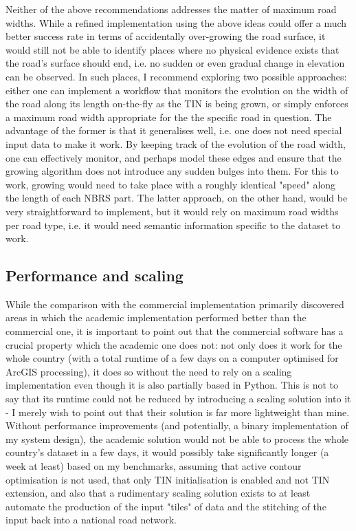 Neither of the above recommendations addresses the matter of maximum road widths. While a refined implementation using the above ideas could offer a much better success rate in terms of accidentally over-growing the road surface, it would still not be able to identify places where no physical evidence exists that the road's surface should end, i.e. no sudden or even gradual change in elevation can be observed. In such places, I recommend exploring two possible approaches: either one can implement a workflow that monitors the evolution on the width of the road along its length on-the-fly as the TIN is being grown, or simply enforces a maximum road width appropriate for the the specific road in question. The advantage of the former is that it generalises well, i.e. one does not need special input data to make it work. By keeping track of the evolution of the road width, one can effectively monitor, and perhaps model these edges and ensure that the growing algorithm does not introduce any sudden bulges into them. For this to work, growing would need to take place with a roughly identical "speed" along the length of each NBRS part. The latter approach, on the other hand, would be very straightforward to implement, but it would rely on maximum road widths per road type, i.e. it would need semantic information specific to the dataset to work.

\subsection{Performance and scaling}
\label{sub:improvementsperformance}

While the comparison with the commercial implementation primarily discovered areas in which the academic implementation performed better than the commercial one, it is important to point out that the commercial software has a crucial property which the academic one does not: not only does it work for the whole country (with a total runtime of a few days on a computer optimised for ArcGIS processing), it does so without the need to rely on a scaling implementation even though it is also partially based in Python. This is not to say that its runtime could not be reduced by introducing a scaling solution into it - I merely wish to point out that their solution is far more lightweight than mine. Without performance improvements (and potentially, a binary implementation of my system design), the academic solution would not be able to process the whole country's dataset in a few days, it would possibly take significantly longer (a week at least) based on my benchmarks, assuming that active contour optimisation is not used, that only TIN initialisation is enabled and not TIN extension, and also that a rudimentary scaling solution exists to at least automate the production of the input "tiles" of data and the stitching of the input back into a national road network.

